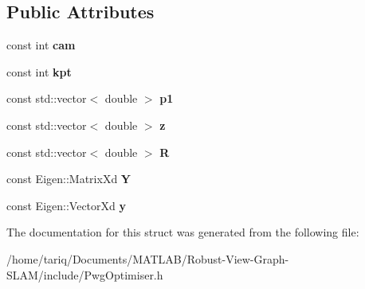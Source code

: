 \subsection*{Public Attributes}
\begin{DoxyCompactItemize}
\item 
const int {\bfseries cam}\hypertarget{structPwgOptimiser_1_1pulled__constraint_a6baab11c5c10c4411ba07d4d5397f973}{}\label{structPwgOptimiser_1_1pulled__constraint_a6baab11c5c10c4411ba07d4d5397f973}

\item 
const int {\bfseries kpt}\hypertarget{structPwgOptimiser_1_1pulled__constraint_a0caa4348b0544a74d0231c2be83a9324}{}\label{structPwgOptimiser_1_1pulled__constraint_a0caa4348b0544a74d0231c2be83a9324}

\item 
const std\+::vector$<$ double $>$ {\bfseries p1}\hypertarget{structPwgOptimiser_1_1pulled__constraint_ad755df2c3eea4f84987883f41b62eede}{}\label{structPwgOptimiser_1_1pulled__constraint_ad755df2c3eea4f84987883f41b62eede}

\item 
const std\+::vector$<$ double $>$ {\bfseries z}\hypertarget{structPwgOptimiser_1_1pulled__constraint_ab64d97f866b4771b20c2e57ebfe644e2}{}\label{structPwgOptimiser_1_1pulled__constraint_ab64d97f866b4771b20c2e57ebfe644e2}

\item 
const std\+::vector$<$ double $>$ {\bfseries R}\hypertarget{structPwgOptimiser_1_1pulled__constraint_a25ea6d42c540cb5667e5691082c0a1ae}{}\label{structPwgOptimiser_1_1pulled__constraint_a25ea6d42c540cb5667e5691082c0a1ae}

\item 
const Eigen\+::\+Matrix\+Xd {\bfseries Y}\hypertarget{structPwgOptimiser_1_1pulled__constraint_a9a2792b99e9f01d3aa88d0244fa17243}{}\label{structPwgOptimiser_1_1pulled__constraint_a9a2792b99e9f01d3aa88d0244fa17243}

\item 
const Eigen\+::\+Vector\+Xd {\bfseries y}\hypertarget{structPwgOptimiser_1_1pulled__constraint_ab5c4120cd329a9a63c86020a24f736bd}{}\label{structPwgOptimiser_1_1pulled__constraint_ab5c4120cd329a9a63c86020a24f736bd}

\end{DoxyCompactItemize}


The documentation for this struct was generated from the following file\+:\begin{DoxyCompactItemize}
\item 
/home/tariq/\+Documents/\+M\+A\+T\+L\+A\+B/\+Robust-\/\+View-\/\+Graph-\/\+S\+L\+A\+M/include/Pwg\+Optimiser.\+h\end{DoxyCompactItemize}

